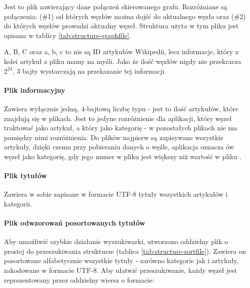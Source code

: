 Jest to plik zawierający dane połączeń skierowanego grafu. Rozróżniane są połączenia: (\#1) od których węzłów można dojść do aktualnego węzła oraz (\#2) do których węzłów prowadzi aktualny węzeł. Struktura użyta w tym pliku jest opisana w tablicy \ref{tab:structure-graphfile}.


A, B, C oraz a, b, c to nie są ID artykułów Wikipedii, lecz informacje, który z kolei artykuł z pliku  mamy na myśli. Jako że ilość węzłów nigdy nie przekracza $2^{24}$, 3 bajty wystarczają na przekazanie tej informacji.

\paragraph{Plik informacyjny }

Zawiera wyłącznie jedną, 4-bajtową liczbę typu  - jest to ilość artykułów, które znajdują się w plikach. Jest to jedyne rozróżnienie dla aplikacji, który węzeł traktować jako artykuł, a który jako kategorię - w pozostałych plikach nie ma pomiędzy nimi rozróżnienia. Do plików najpierw są zapisywane wszystkie artykuły, dzięki czemu przy pobieraniu danych o węźle, aplikacja oznacza ów węzeł jako kategorię, gdy jego numer w pliku  jest większy niż wartość w pliku . 

\paragraph{Plik tytułów }

Zawiera w sobie zapisane w formacie UTF-8 tytuły wszystkich artykułów i kategorii.

\paragraph{Plik odwzorowań posortowanych tytułów }

Aby umożliwić szybkie działanie wyszukiwarki, utworzono oddzielny plik o prostej do przeszukiwania strukturze (tablica \ref{tab:structure-sortfile}). Zawiera on posortowane alfabetycznie wszystkie tytuły - zarówno kategorie jak i artykuły, zakodowane w formacie UTF-8. Aby ułatwić przeszukiwanie, każdy węzeł jest reprezentowany przez oddzielny wiersz o formacie:

